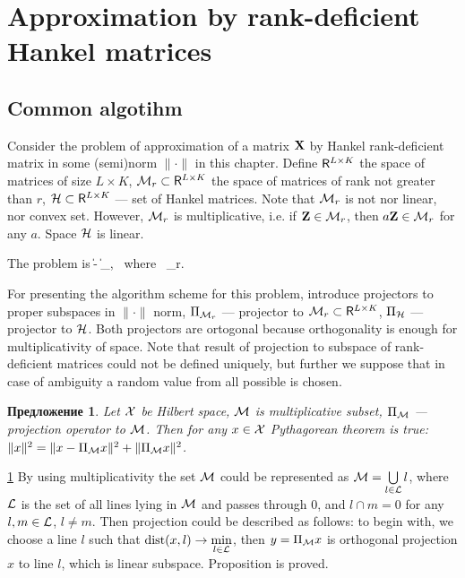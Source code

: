 \documentclass[12pt,a4paper,fleqn,leqno]{article}
\newtheorem{proposition}{Предложение}
\begin{document}
\section{Approximation by rank-deficient Hankel matrices}
\label{sec:lowrank_appr}
\subsection{Common algotihm}
Consider the problem of approximation of a matrix $\mathbf{X}$ by Hankel rank-deficient matrix in some (semi)norm $\|\cdot\|$ in this chapter. Define $\mathsf{R}^{L\times K}$ the space of matrices of size $L \times K$, $\mathcal{M}_r\subset \mathsf{R}^{L\times K}$ the space of matrices of rank not greater than $r$,
$\mathcal{H} \subset \mathsf{R}^{L\times K}$ --- set of Hankel matrices.
Note that  $\mathcal{M}_r$ is not nor linear, nor convex set. However, $\mathcal{M}_r$ is multiplicative, i.e.
if $\mathbf{Z}\in \mathcal{M}_r$, then $a\mathbf{Z}\in \mathcal{M}_r$ for any $a$.
Space $\mathcal{H}$ is linear.

The problem is
\be
\label{eq:gen_task}
\|\bfX - \bfY\| \to \min_\bfY, \mbox{\ where\ } \bfY \in \calH \cap \calM_r.
\ee

For presenting the algorithm scheme for this problem, introduce projectors to proper subspaces in $\|\cdot\|$ norm, $\Pi_{\mathcal{M}_r}$ --- projector to $\mathcal{M}_r\subset \mathsf{R}^{L\times K}$,
$\Pi_{\mathcal{H}}$ --- projector to $\mathcal{H}$.
Both projectors are ortogonal because orthogonality is enough for multiplicativity of space. Note that result of projection to subspace of rank-deficient matrices could not be defined uniquely, but further we suppose that in case of ambiguity a random value from all possible is chosen.

\begin{proposition} \label{pythaprop}
Let $\mathcal{X}$ be Hilbert space, $\mathcal{M}$ is multiplicative subset, $\Pi_{\mathcal{M}}$ --- projection operator to $\mathcal{M}$. Then for any $x \in \mathcal{X}$ Pythagorean theorem is true: $\|x\|^2 = \|x - \Pi_{\mathcal{M}} x\|^2 + \|\Pi_{\mathcal{M}} x\|^2$.
\end{proposition}
\begin{proof5}{\ref{pythaprop}}
By using multiplicativity the set $\mathcal{M}$ could be represented as $\mathcal{M} = \bigcup\limits_{l \in \mathcal{L}}l$, where $\mathcal{L}$ is the set of all lines lying in $\mathcal{M}$ and passes through $0$, and $l \cap m = 0$ for any $l, m \in \mathcal{L}$, $l \neq m$. Then projection could be described as follows: to begin with, we choose a line $l$ such that $\mathop{\mathrm{dist}}(x, l) \rightarrow \min\limits_{l \in \mathcal{L}}$, then $y = \Pi_{\mathcal{M}} x$ is orthogonal projection $x$ to line $l$, which is linear subspace. Proposition is proved.
\end{proof5}
\end{document}
